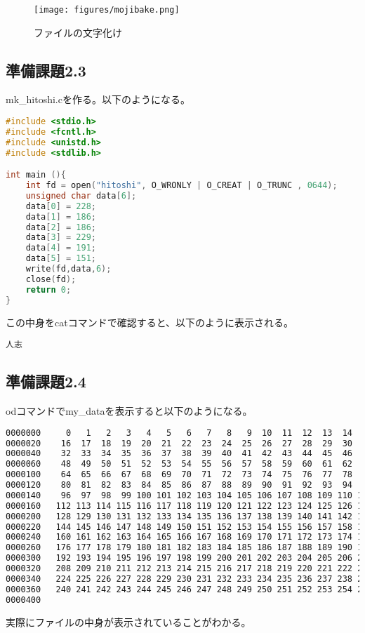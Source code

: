 \documentclass{ltjsarticle}
\begin{document}
\begin{figure}[H]
  \begin{center}
    \texttt{[image: figures/mojibake.png]}
    \caption{ファイルの文字化け}
  \end{center}
\end{figure}

\subsection{準備課題2.3}
mk\_hitoshi.cを作る。以下のようになる。
\begin{lstlisting}[caption=hitoshi.c,language=C]
#include <stdio.h>
#include <fcntl.h>
#include <unistd.h>
#include <stdlib.h>

int main (){
    int fd = open("hitoshi", O_WRONLY | O_CREAT | O_TRUNC , 0644);
    unsigned char data[6];
    data[0] = 228;
    data[1] = 186;
    data[2] = 186;
    data[3] = 229;
    data[4] = 191;
    data[5] = 151;
    write(fd,data,6);
    close(fd);
    return 0;
}
\end{lstlisting}
この中身をcatコマンドで確認すると、以下のように表示される。
\begin{lstlisting}[caption=hitoshi]
人志
\end{lstlisting}
\subsection{準備課題2.4}
odコマンドでmy\_dataを表示すると以下のようになる。
\begin{lstlisting}[caption=od,language=bash]
% od -t u1 my_data
0000000     0   1   2   3   4   5   6   7   8   9  10  11  12  13  14  15
0000020    16  17  18  19  20  21  22  23  24  25  26  27  28  29  30  31
0000040    32  33  34  35  36  37  38  39  40  41  42  43  44  45  46  47
0000060    48  49  50  51  52  53  54  55  56  57  58  59  60  61  62  63
0000100    64  65  66  67  68  69  70  71  72  73  74  75  76  77  78  79
0000120    80  81  82  83  84  85  86  87  88  89  90  91  92  93  94  95
0000140    96  97  98  99 100 101 102 103 104 105 106 107 108 109 110 111
0000160   112 113 114 115 116 117 118 119 120 121 122 123 124 125 126 127
0000200   128 129 130 131 132 133 134 135 136 137 138 139 140 141 142 143
0000220   144 145 146 147 148 149 150 151 152 153 154 155 156 157 158 159
0000240   160 161 162 163 164 165 166 167 168 169 170 171 172 173 174 175
0000260   176 177 178 179 180 181 182 183 184 185 186 187 188 189 190 191
0000300   192 193 194 195 196 197 198 199 200 201 202 203 204 205 206 207
0000320   208 209 210 211 212 213 214 215 216 217 218 219 220 221 222 223
0000340   224 225 226 227 228 229 230 231 232 233 234 235 236 237 238 239
0000360   240 241 242 243 244 245 246 247 248 249 250 251 252 253 254 255
0000400
\end{lstlisting}
実際にファイルの中身が表示されていることがわかる。
\end{document}
